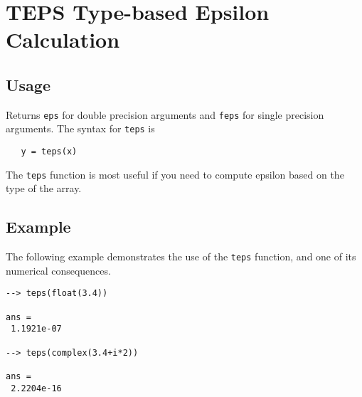 \section{TEPS Type-based Epsilon Calculation}

\subsection{Usage}

Returns \verb|eps| for double precision arguments and
\verb|feps| for single precision arguments.  The syntax for
\verb|teps| is
\begin{verbatim}
   y = teps(x)
\end{verbatim}
The \verb|teps| function is most useful if you need to
compute epsilon based on the type of the array.
\subsection{Example}

The following example demonstrates the use of the \verb|teps| function,
and one of its numerical consequences.
\begin{verbatim}
--> teps(float(3.4))

ans = 
 1.1921e-07 

--> teps(complex(3.4+i*2))

ans = 
 2.2204e-16 
\end{verbatim}
